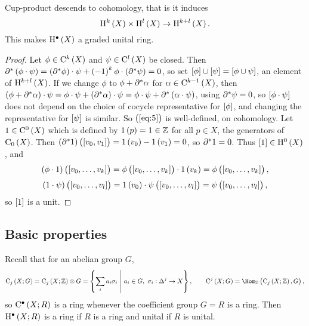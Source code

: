 \begin{corollary}
Cup-product descends to cohomology, that is it induces
\begin{equation}
\label{eq:5}
\H^k\br{X} \times \H^l\br{X} \to \H^{k + l}\br{X}.
\end{equation}
This makes $ \H^\bullet\br{X} $ a graded unital ring.
\end{corollary}

\begin{proof}
Let $ \phi \in \C^k\br{X} $ and $ \psi \in \C^l\br{X} $ be closed. Then $ \da^*\br{\phi \cdot \psi} = \br{\da^*\phi} \cdot \psi + \br{-1}^k\phi \cdot \br{\da^*\psi} = 0 $, so set $ \sbr{\phi} \cup \sbr{\psi} = \sbr{\phi \cup \psi} $, an element of $ \H^{k + l}\br{X} $. If we change $ \phi $ to $ \phi + \partial^*\alpha $ for $ \alpha \in \C^{k - 1}\br{X} $, then $ \br{\phi + \da^*\alpha} \cdot \psi = \phi \cdot \psi + \br{\da^*\alpha} \cdot \psi = \phi \cdot \psi + \da^*\br{\alpha \cdot \psi} $, using $ \partial^*\psi = 0 $, so $ \sbr{\phi \cdot \psi} $ does not depend on the choice of cocycle representative for $ \sbr{\phi} $, and changing the representative for $ \sbr{\psi} $ is similar. So $ \br{\ref{eq:5}} $ is well-defined, on cohomology. Let $ 1 \in \C^0\br{X} $ which is defined by $ 1\br{p} = 1 \in \ZZ $ for all $ p \in X $, the generators of $ \C_0\br{X} $. Then $ \br{\da^*1}\br{\sbr{v_0, v_1}} = 1\br{v_0} - 1\br{v_1} = 0 $, so $ \partial^*1 = 0 $. Thus $ \sbr{1} \in \H^0\br{X} $, and
$$ \br{\phi \cdot 1}\br{\sbr{v_0, \dots, v_k}} = \phi\br{\sbr{v_0, \dots, v_k}} \cdot 1\br{v_k} = \phi\br{\sbr{v_0, \dots, v_k}}, $$
$$ \br{1 \cdot \psi}\br{\sbr{v_0, \dots, v_l}} = 1\br{v_0} \cdot \psi\br{\sbr{v_0, \dots, v_l}} = \psi\br{\sbr{v_0, \dots, v_l}}, $$
so $ \sbr{1} $ is a unit.
\end{proof}

\pagebreak

\subsection{Basic properties}

Recall that for an abelian group $ G $,
$$ \C_j\br{X; G} = \C_j\br{X; \ZZ} \otimes G = \cbr{\sum_i a_i\sigma_i \st a_i \in G, \ \sigma_i : \Delta^j \to X}, \qquad \C^j\br{X; G} = \Hom_\ZZ\br{\C_j\br{X; \ZZ}, G}, $$
so $ \C^\bullet\br{X; R} $ is a ring whenever the coefficient group $ G = R $ is a ring. Then $ \H^\bullet\br{X; R} $ is a ring if $ R $ is a ring and unital if $ R $ is unital.

